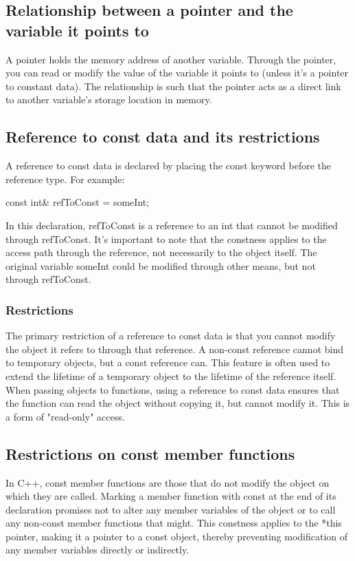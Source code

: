 \documentclass{report}
\begin{document}
    \bigbreak \noindent 
    \subsection{Relationship between a pointer and the variable it points to}
    \bigbreak \noindent 
    A pointer holds the memory address of another variable. Through the pointer, you can read or modify the value of the variable it points to (unless it's a pointer to constant data). The relationship is such that the pointer acts as a direct link to another variable's storage location in memory.

    \pagebreak 
    \bigbreak \noindent 
    \subsection{Reference to const data and its restrictions}
    \bigbreak \noindent 
    A reference to const data is declared by placing the const keyword before the reference type. For example:
    \bigbreak \noindent 
    \begin{cppcode}
    const int& refToConst = someInt;
    \end{cppcode}
    \bigbreak \noindent 
    In this declaration, refToConst is a reference to an int that cannot be modified through refToConst. It's important to note that the constness applies to the access path through the reference, not necessarily to the object itself. The original variable someInt could be modified through other means, but not through refToConst.
    \bigbreak \noindent 
    \subsubsection{Restrictions}
    \bigbreak \noindent 
    The primary restriction of a reference to const data is that you cannot modify the object it refers to through that reference.
    \bigbreak \noindent 
    A non-const reference cannot bind to temporary objects, but a const reference can. This feature is often used to extend the lifetime of a temporary object to the lifetime of the reference itself.
    \bigbreak \noindent 
     When passing objects to functions, using a reference to const data ensures that the function can read the object without copying it, but cannot modify it. This is a form of "read-only" access.

     \bigbreak \noindent 
     \subsection{Restrictions on const member functions}
     \bigbreak \noindent 
    In C++, const member functions are those that do not modify the object on which they are called. Marking a member function with const at the end of its declaration promises not to alter any member variables of the object or to call any non-const member functions that might. This constness applies to the *this pointer, making it a pointer to a const object, thereby preventing modification of any member variables directly or indirectly.
    \bigbreak \noindent 
\end{document}
